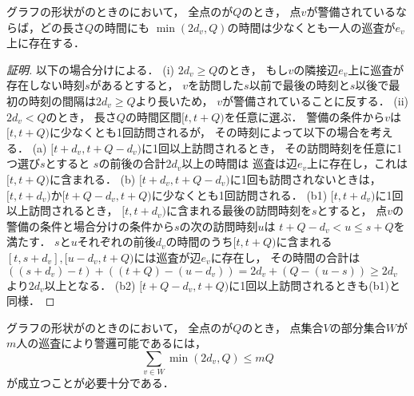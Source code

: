 \begin{lemm}
\label{lemm:star_cost_of_vertex}
グラフの形状が{\graphStar}のときの{\patProb}において，
全点の{\maxIdletime}が$Q$のとき，
点$v$が警備されているならば，どの長さ$Q$の時間にも
$\min(2d_v, Q)$の時間は少なくとも一人の巡査が$e_v$上に存在する．
\end{lemm}
\begin{proof}[証明]
以下の場合分けによる．
(i) $2d_v \geq Q$のとき，
もし$v$の隣接辺$e_v$上に巡査が存在しない時刻$s$があるとすると，
$v$を訪問した$s$以前で最後の時刻と$s$以後で最初の時刻の間隔は$2d_v \geq Q$より長いため，
$v$が警備されていることに反する．
%
(ii) $2d_v < Q$のとき，
長さ$Q$の時間区間$[t, t + Q)$を任意に選ぶ．
警備の条件から$v$は$[t, t + Q)$に少なくとも1回訪問されるが，
その時刻によって以下の場合を考える．
%
(a) $[t + d_v, t + Q - d_v)$に1回以上訪問されるとき，
その訪問時刻を任意に1つ選び$s$とすると
$s$の前後の合計$2d_v$以上の時間は
巡査は辺$e_v$上に存在し，これは$[t, t + Q)$に含まれる．
%
(b) $[t + d_v, t + Q - d_v)$に1回も訪問されないときは，
$[t, t + d_v)$か$[t + Q - d_v, t + Q)$に少なくとも1回訪問される．
(b1) $[t, t + d_v)$に1回以上訪問されるとき，
$[t, t + d_v)$に含まれる最後の訪問時刻を$s$とすると，
点$v$の警備の条件と場合分けの条件から$s$の次の訪問時刻$u$は
$t + Q - d_v < u \leq s + Q$を満たす．
$s$と$u$それぞれの前後$d_v$の時間のうち$[t, t + Q)$に含まれる
$[t, s + d_v], [u - d_v, t + Q)$には巡査が辺$e_v$に存在し，
その時間の合計は
$((s + d_v) - t) + ((t + Q) - (u - d_v)) = 2d_v + (Q - (u - s)) \geq 2d_v$
より$2d_v$以上となる．
(b2) $[t + Q - d_v, t + Q)$に1回以上訪問されるときも(b1)と同様．
\end{proof}



\begin{lemm}
\label{lemm:condition_of_guarding_star}
グラフの形状が{\graphStar}のときの{\patProb}において，
全点の{\maxIdletime}が$Q$のとき，
点集合$V$の部分集合$W$が
$m$人の巡査により警邏可能であるには，
\begin{equation}
  \label{equation: star bound}
\sum_{v \in W} \min(2d_v, Q) \leq mQ
\end{equation}
が成立つことが必要十分である．
\end{lemm}


